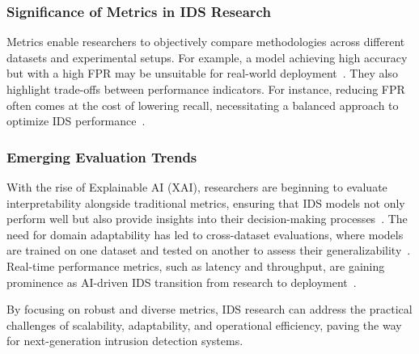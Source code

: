 \subsubsection{Significance of Metrics in IDS Research} Metrics enable researchers to objectively compare methodologies across different datasets and experimental setups. For example, a model achieving high accuracy but with a high FPR may be unsuitable for real-world deployment~\cite{Jayalaxmi2022}. They also highlight trade-offs between performance indicators. For instance, reducing FPR often comes at the cost of lowering recall, necessitating a balanced approach to optimize IDS performance~\cite{Gutierrez2023}.

\subsubsection{Emerging Evaluation Trends} With the rise of Explainable AI (XAI), researchers are beginning to evaluate interpretability alongside traditional metrics, ensuring that IDS models not only perform well but also provide insights into their decision-making processes~\cite{Islam2023}. The need for domain adaptability has led to cross-dataset evaluations, where models are trained on one dataset and tested on another to assess their generalizability~\cite{Sadia2024}. Real-time performance metrics, such as latency and throughput, are gaining prominence as AI-driven IDS transition from research to deployment~\cite{Ghadermazi2024}.

By focusing on robust and diverse metrics, IDS research can address the practical challenges of scalability, adaptability, and operational efficiency, paving the way for next-generation intrusion detection systems.





